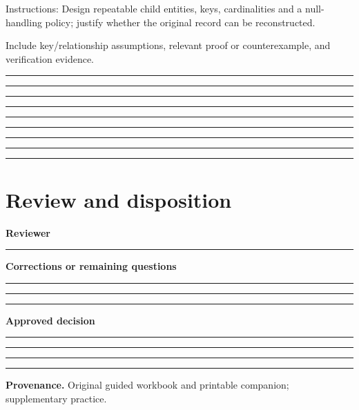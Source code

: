 \documentclass[11pt,letterpaper]{article}
\newcommand{\ResponseLine}{\par\vspace{1.05em}\noindent\rule{\linewidth}{0.4pt}\par}
\newcommand{\ResponseArea}{\ResponseLine\ResponseLine\ResponseLine}
\begin{document}
Instructions: Design repeatable child entities, keys, cardinalities and a null-handling policy; justify whether the original record can be reconstructed.

Include key/relationship assumptions, relevant proof or counterexample, and verification evidence.

\ResponseArea\ResponseArea\ResponseArea
\section{Review and disposition}
\textbf{Reviewer}\ResponseLine\textbf{Corrections or remaining questions}\ResponseArea\textbf{Approved decision}\ResponseArea
\vfill
\hrule
{\footnotesize\textbf{Provenance.} Original guided workbook and printable companion; supplementary practice.}
\end{document}
